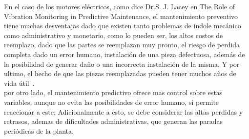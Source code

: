 		En el caso de los motores eléctricos, como dice Dr.S. J. Lacey en The Role of Vibration Monitoring in Predictive Maintenance, el mantenimiento preventivo tiene muchas desventajas dado que existen tanto problemas de índole mecánico como administrativo y monetario, como lo pueden ser, los altos costos de reemplazo, dado que las partes se reemplazan muy pronto, el riesgo de perdida completa dado un error humano, instalación de una pieza defectuosa, además de la posibilidad de generar daño o una incorrecta instalación de la misma, Y por ultimo, el hecho de que las piezas reemplazadas pueden tener muchos años de vida útil~\cite{Lacey}.\\
		por otro lado, el mantenimiento predictivo ofrece mas control sobre estas variables, aunque no evita las posibilidades de error humano, si permite reaccionar a este; Adicionalmente a esto, se debe considerar las altas perdidas y retrasos, ademas de dificultades administrativas, que generan las paradas periódicas de la planta.




	